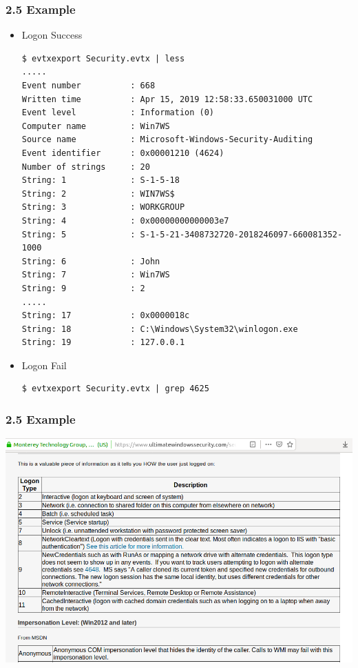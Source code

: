 \begin{frame}[fragile]
  \frametitle{2.5 Example}
    \begin{itemize}
        \item Logon Success
  \begin{lstlisting}[basicstyle=\tiny]
$ evtxexport Security.evtx | less
.....
Event number          : 668
Written time          : Apr 15, 2019 12:58:33.650031000 UTC
Event level           : Information (0)
Computer name         : Win7WS
Source name           : Microsoft-Windows-Security-Auditing
Event identifier      : 0x00001210 (4624)
Number of strings     : 20
String: 1             : S-1-5-18
String: 2             : WIN7WS$
String: 3             : WORKGROUP
String: 4             : 0x00000000000003e7
String: 5             : S-1-5-21-3408732720-2018246097-660081352-1000
String: 6             : John
String: 7             : Win7WS
String: 9             : 2
.....
String: 17            : 0x0000018c
String: 18            : C:\Windows\System32\winlogon.exe
String: 19            : 127.0.0.1
  \end{lstlisting}
        \item Logon Fail
  \begin{lstlisting}[basicstyle=\tiny]
$ evtxexport Security.evtx | grep 4625
  \end{lstlisting}
    \end{itemize}
\end{frame}


\begin{frame}[fragile]
  \frametitle{2.5 Example}
    \includegraphics[scale=0.4]{images/f14_logonType.png}
\end{frame}


